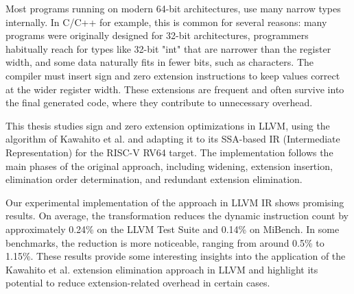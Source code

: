 Most programs running on modern 64-bit architectures, use many narrow types internally. In C/C++ for example, this is common for several reasons: 
many programs were originally designed for 32-bit architectures, programmers habitually 
reach for types like 32-bit "int" that are narrower than the register width, and some data naturally fits in fewer bits, such as characters.
The compiler must insert sign and zero extension instructions to keep values correct at the wider register width. 
These extensions are frequent and often survive into the final generated code, where they contribute to unnecessary overhead.

This thesis studies sign and zero extension optimizations in LLVM, using the algorithm of Kawahito et al. 
and adapting it to its SSA-based IR (Intermediate Representation) for the RISC-V RV64 target. 
The implementation follows the main phases of the original approach, including widening, extension
insertion, elimination order determination, and redundant extension elimination.

Our experimental implementation of the approach in LLVM IR shows promising results. On average, the transformation reduces the dynamic instruction count by approximately 0.24\% on the LLVM Test Suite and 0.14\% on MiBench. In some benchmarks, the reduction is more noticeable, ranging from around 0.5\% to 1.15\%. These results provide some interesting insights into the application of the Kawahito et al. extension elimination approach in LLVM and highlight its potential to reduce extension-related overhead in certain cases.
